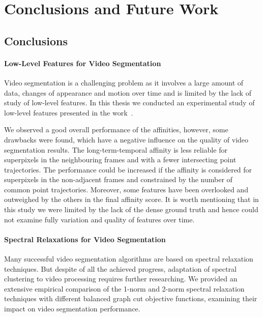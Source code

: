 \chapter{Conclusions and Future Work}
\label{Chapter6}
\section{Conclusions} 
\subsubsection*{Low-Level Features for Video Segmentation}
Video segmentation is a challenging problem as it involves a large amount of data, changes of appearance and motion over time and is limited by the lack of study of low-level features.
In this thesis we conducted an experimental study of low-level features presented in the work~\cite{GalassoCS12}. 

We observed a good overall performance of the affinities, however, some drawbacks were found, which have a negative influence on the quality of video segmentation results.
The long-term-temporal affinity is less reliable for superpixels in the neighbouring frames and with a fewer intersecting point trajectories.
The performance could be increased if the affinity is considered for superpixels in the non-adjacent frames and constrained by the number of common point trajectories.
Moreover, some features have been overlooked and outweighed by the others in the final affinity score. It is worth mentioning that in this study we were limited by the lack of the dense ground truth
and hence could not examine fully variation and quality of features over time.
\subsubsection*{Spectral Relaxations for Video Segmentation}
%
Many successful video segmentation algorithms are based on spectral relaxation techniques. 
But despite of all the achieved progress, adaptation of spectral clustering to video processing requires further researching.
We provided an extensive empirical comparison of the 1-norm and 2-norm spectral relaxation techniques with different balanced graph cut objective functions, examining their impact on video segmentation performance.

